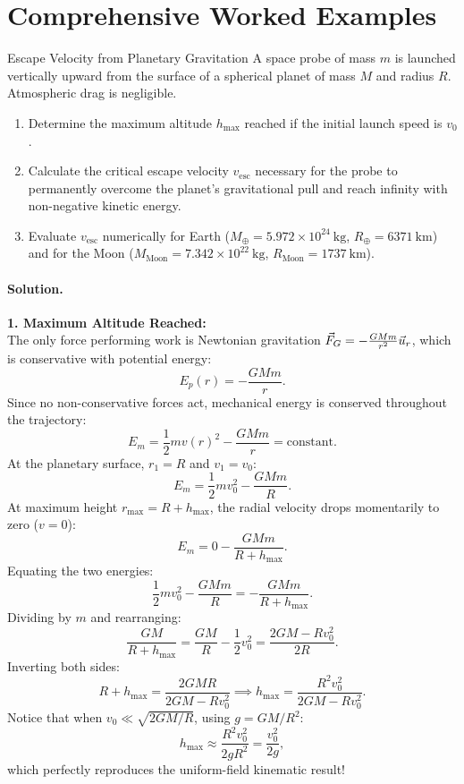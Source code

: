 \section{Comprehensive Worked Examples}

\begin{workedexample}{Escape Velocity from Planetary Gravitation}
A space probe of mass $m$ is launched vertically upward from the surface of a spherical planet of mass $M$ and radius $R$. Atmospheric drag is negligible.
\begin{enumerate}[leftmargin=1.4em,itemsep=3pt]
  \item Determine the maximum altitude $h_{\max}$ reached if the initial launch speed is $v_0$.
  \item Calculate the critical escape velocity $v_{\text{esc}}$ necessary for the probe to permanently overcome the planet's gravitational pull and reach infinity with non-negative kinetic energy.
  \item Evaluate $v_{\text{esc}}$ numerically for Earth ($M_\oplus = 5.972\times 10^{24}\ \mathrm{kg}$, $R_\oplus = 6371\ \mathrm{km}$) and for the Moon ($M_{\text{Moon}} = 7.342\times 10^{22}\ \mathrm{kg}$, $R_{\text{Moon}} = 1737\ \mathrm{km}$).
\end{enumerate}

\paragraph{Solution.}
\textbf{1. Maximum Altitude Reached:}\\
The only force performing work is Newtonian gravitation $\vec{F}_G = -\frac{G M m}{r^2}\vec{u}_r$, which is conservative with potential energy:
\[
E_p(r) = -\frac{G M m}{r}.
\]
Since no non-conservative forces act, mechanical energy is conserved throughout the trajectory:
\[
E_m = \frac{1}{2}m v(r)^2 - \frac{G M m}{r} = \text{constant}.
\]
At the planetary surface, $r_1 = R$ and $v_1 = v_0$:
\[
E_m = \frac{1}{2}m v_0^2 - \frac{G M m}{R}.
\]
At maximum height $r_{\max} = R + h_{\max}$, the radial velocity drops momentarily to zero ($v = 0$):
\[
E_m = 0 - \frac{G M m}{R + h_{\max}}.
\]
Equating the two energies:
\[
\frac{1}{2}m v_0^2 - \frac{G M m}{R} = -\frac{G M m}{R + h_{\max}}.
\]
Dividing by $m$ and rearranging:
\[
\frac{G M}{R + h_{\max}} = \frac{G M}{R} - \frac{1}{2}v_0^2 = \frac{2GM - R v_0^2}{2R}.
\]
Inverting both sides:
\[
R + h_{\max} = \frac{2GM R}{2GM - R v_0^2} \implies h_{\max} = \frac{R^2 v_0^2}{2GM - R v_0^2}.
\]
Notice that when $v_0 \ll \sqrt{2GM/R}$, using $g = GM/R^2$:
\[
h_{\max} \approx \frac{R^2 v_0^2}{2gR^2} = \frac{v_0^2}{2g},
\]
which perfectly reproduces the uniform-field kinematic result!


\end{workedexample}

